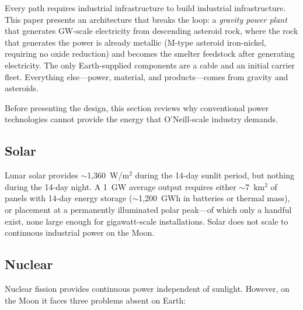 \documentclass[12pt,letterpaper]{article}
\begin{document}
Every path requires industrial infrastructure to build industrial infrastructure. This paper presents an architecture that breaks the loop: a \emph{gravity power plant} that generates GW-scale electricity from descending asteroid rock, where the rock that generates the power is already metallic (M-type asteroid iron-nickel, requiring no oxide reduction) and becomes the smelter feedstock after generating electricity. The only Earth-supplied components are a cable and an initial carrier fleet. Everything else---power, material, and products---comes from gravity and asteroids.

Before presenting the design, this section reviews why conventional power technologies cannot provide the energy that O'Neill-scale industry demands.

\subsection{Solar}

Lunar solar provides $\sim$1,360~W/m$^2$ during the 14-day sunlit period, but nothing during the 14-day night. A 1~GW average output requires either $\sim$7~km$^2$ of panels with 14-day energy storage ($\sim$1,200~GWh in batteries or thermal mass), or placement at a permanently illuminated polar peak---of which only a handful exist, none large enough for gigawatt-scale installations. Solar does not scale to continuous industrial power on the Moon.

\subsection{Nuclear}

Nuclear fission provides continuous power independent of sunlight. However, on the Moon it faces three problems absent on Earth:
\end{document}
